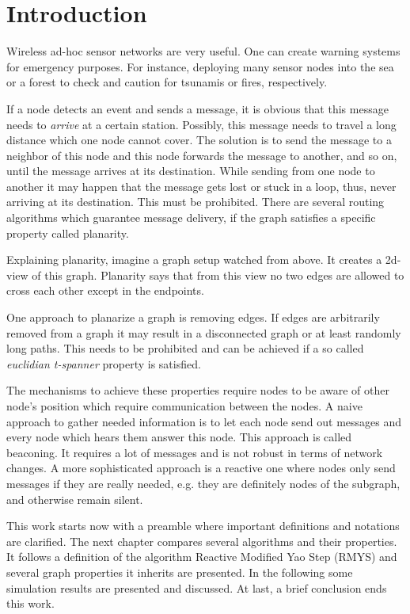 \section{Introduction}
Wireless ad-hoc sensor networks are very useful. 
One can create warning systems for emergency purposes.
For instance, deploying many sensor nodes into the sea or a forest to check and caution for tsunamis or fires, respectively.

If a node detects an event and sends a message, it is obvious that this message needs to \emph{arrive} at a certain station.
Possibly, this message needs to travel a long distance which one node cannot cover.
The solution is to send the message to a neighbor of this node and this node forwards the message to another, and so on, until the message arrives at its destination.
While sending from one node to another it may happen that the message gets lost or stuck in a loop, thus, never arriving at its destination.
This must be prohibited.
There are several routing algorithms which guarantee message delivery, if the graph satisfies a specific property called planarity.

Explaining planarity, imagine a graph setup watched from above. 
It creates a 2d-view of this graph.
Planarity says that from this view no two edges are allowed to cross each other except in the endpoints.

One approach to planarize a graph is removing edges.
If edges are arbitrarily removed from a graph it may result in a disconnected graph or at least randomly long paths.
This needs to be prohibited and can be achieved if a so called \emph{euclidian t-spanner} property is satisfied.

The mechanisms to achieve these properties require nodes to be aware of other node's position which require communication between the nodes.
A naive approach to gather needed information is to let each node send out messages and every node which hears them answer this node.
This approach is called beaconing.
It requires a lot of messages and is not robust in terms of network changes.
A more sophisticated approach is a reactive one where nodes only send messages if they are really needed, e.g. they are definitely nodes of the subgraph, and otherwise remain silent. 

This work starts now with a preamble where important definitions and notations are clarified.
The next chapter compares several algorithms and their properties.
It follows a definition of the algorithm Reactive Modified Yao Step (RMYS) and several graph properties it inherits are presented.
In the following some simulation results are presented and discussed.
At last, a brief conclusion ends this work.